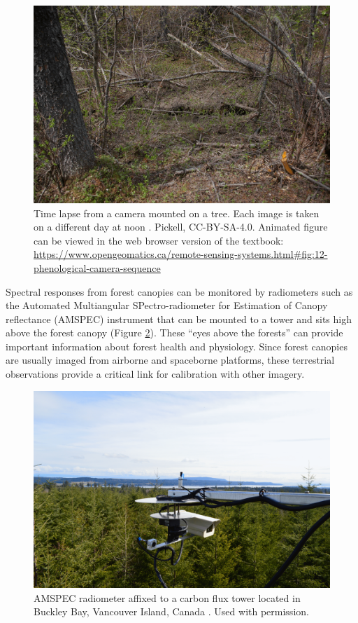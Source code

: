 \documentclass[
]{book}
\begin{document}
\begin{figure}
\includegraphics[width=0.9\linewidth]{images/12-phenological-camera-sequence-static} \caption{Time lapse from a camera mounted on a tree. Each image is taken on a different day at noon \citep{bater_timelapse_nodate}. Pickell, CC-BY-SA-4.0. Animated figure can be viewed in the web browser version of the textbook: \url{https://www.opengeomatics.ca/remote-sensing-systems.html\#fig:12-phenological-camera-sequence}}\label{fig:12-phenological-camera-sequence}
\end{figure}

Spectral responses from forest canopies can be monitored by radiometers such as the Automated Multiangular SPectro-radiometer for Estimation of Canopy reflectance (AMSPEC) instrument that can be mounted to a tower and sits high above the forest canopy (Figure \ref{fig:12-flux-tower-radiometer}). These ``eyes above the forests'' can provide important information about forest health and physiology. Since forest canopies are usually imaged from airborne and spaceborne platforms, these terrestrial observations provide a critical link for calibration with other imagery.



\begin{figure}
\includegraphics[width=0.75\linewidth]{images/12-flux-tower-radiometer} \caption{AMSPEC radiometer affixed to a carbon flux tower located in Buckley Bay, Vancouver Island, Canada \citep{coops_amspec_nodate}. Used with permission.}\label{fig:12-flux-tower-radiometer}
\end{figure}
\end{document}
